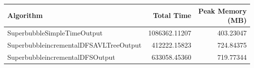 \begin{tabular}{lrr}
\toprule
Algorithm & Total Time & Peak Memory (MB) \\
\midrule
SuperbubbleSimpleTimeOutput & 1086362.11207 & 403.23047 \\
SuperbubbleincrementalDFSAVLTreeOutput & 412222.15823 & 724.84375 \\
SuperbubbleincrementalDFSOutput & 633058.45360 & 719.77344 \\
\bottomrule
\end{tabular}
